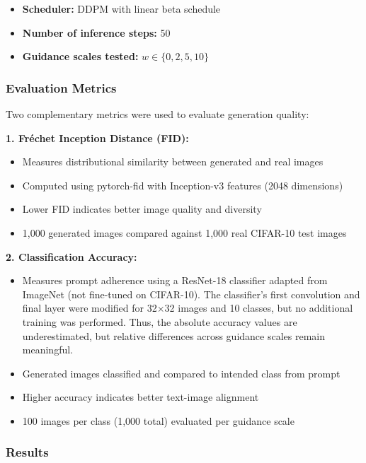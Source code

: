 \begin{itemize}
    \item \textbf{Scheduler:} DDPM with linear beta schedule
    \item \textbf{Number of inference steps:} 50
    \item \textbf{Guidance scales tested:} $w \in \{0, 2, 5, 10\}$
\end{itemize}

\subsubsection{Evaluation Metrics}

Two complementary metrics were used to evaluate generation quality:

\textbf{1. Fréchet Inception Distance (FID):}
\begin{itemize}
    \item Measures distributional similarity between generated and real images
    \item Computed using pytorch-fid with Inception-v3 features (2048 dimensions)
    \item Lower FID indicates better image quality and diversity
    \item 1,000 generated images compared against 1,000 real CIFAR-10 test images
\end{itemize}

\textbf{2. Classification Accuracy:}
\begin{itemize}
    \item Measures prompt adherence using a ResNet-18 classifier adapted from ImageNet (not fine-tuned on CIFAR-10). The classifier's first convolution and final layer were modified for 32$\times$32 images and 10 classes, but no additional training was performed. Thus, the absolute accuracy values are underestimated, but relative differences across guidance scales remain meaningful.
    \item Generated images classified and compared to intended class from prompt
    \item Higher accuracy indicates better text-image alignment
    \item 100 images per class (1,000 total) evaluated per guidance scale
\end{itemize}


\subsubsection{Results}

